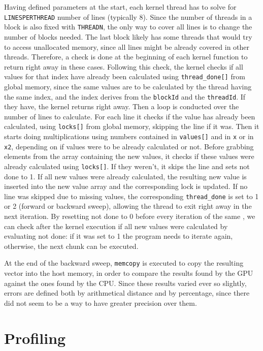 \documentclass[a4paper,oneside]{report}
\begin{document}
    Having defined parameters at the start, each kernel thread has to solve for \verb|LINESPERTHREAD| number of lines (typically 8). Since the number of threads in a block is also fixed with \verb|THREADN|, the only way to cover all lines is to change the number of blocks needed. The last block likely has some threads that would try to access unallocated memory, since all lines might be already covered in other threads. Therefore, a check is done at the beginning of each kernel function to return right away in these cases. Following this check, the kernel checks if all values for that index have already been calculated using \verb|thread_done[]| from global memory, since the same values are to be calculated by the thread having the same index, and the index derives from the \verb|blockId| and the \verb|threadId|. If they have, the kernel returns right away. Then a loop is conducted over the number of lines to calculate. For each line it checks if the value has already been calculated, using \verb|locks[]| from global memory, skipping the line if it was. Then it starts doing multiplications using numbers contained in \verb|values[]| and in \verb|x| or in \verb|x2|, depending on if values were to be already calculated or not. Before grabbing elements from the array containing the new values, it checks if these values were already calculated using \verb|locks[]|. If they weren't, it skips the line and sets not done to 1. If all new values were already calculated, the resulting new value is inserted into the new value array and the corresponding lock is updated. If no line was skipped due to missing values, the corresponding \verb|thread_done| is set to 1 or 2 (forward or backward sweep), allowing the thread to exit right away in the next iteration. By resetting not done to 0 before every iteration of the same , we can check after the kernel execution if all new values were calculated by evaluating not done: if it was set to 1 the program needs to iterate again, otherwise, the next chunk can be executed.

    At the end of the backward sweep, \verb|memcopy| is executed to copy the resulting vector into the host memory, in order to compare the results found by the GPU against the ones found by the CPU. Since these results varied ever so slightly, errors are defined both by arithmetical distance and by percentage, since there did not seem to be a way to have greater precision over them.
    
    


    \chapter*{Profiling}
\end{document}
